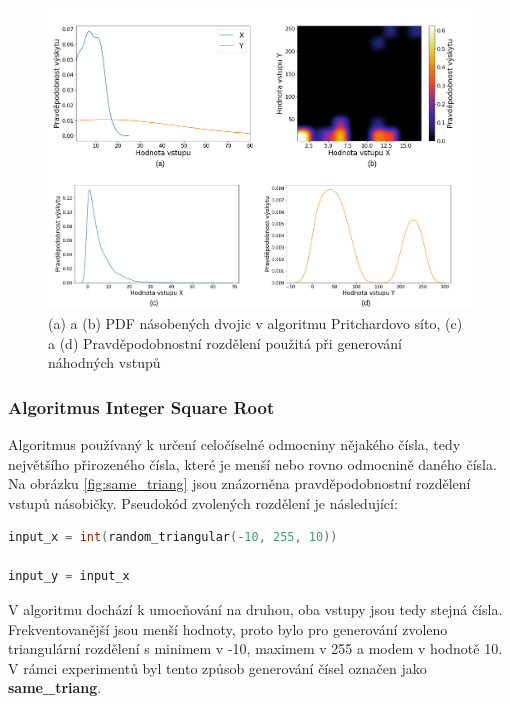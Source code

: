\begin{figure}[H]
    \centering
    \includegraphics[width=\textwidth]{obrazky-figures/gamma_2norm_all.png}
    \caption{(a) a (b) PDF násobených dvojic v algoritmu Pritchardovo síto, (c) a (d) Pravděpodobnostní rozdělení použitá při generování náhodných vstupů}
    \label{fig:gamma_2norm}
\end{figure}

\pagebreak

\subsubsection{Algoritmus Integer Square Root}
Algoritmus používaný k určení celočíselné odmocniny nějakého čísla, tedy největšího přirozeného čísla, které je menší nebo rovno odmocnině daného čísla. Na obrázku \ref{fig:same_triang} jsou znázorněna pravděpodobnostní rozdělení vstupů násobičky. Pseudokód zvolených rozdělení je následující:

\begin{lstlisting}[language={C}, label={lst:isqrt}]
input_x = int(random_triangular(-10, 255, 10))

input_y = input_x
\end{lstlisting}

V algoritmu dochází k umocňování na druhou, oba vstupy jsou tedy stejná čísla. Frekventovanější jsou menší hodnoty, proto bylo pro generování zvoleno triangulární rozdělení s minimem v -10, maximem v 255 a modem v hodnotě 10. V rámci experimentů byl tento způsob generování čísel označen jako \textbf{same\_triang}.

